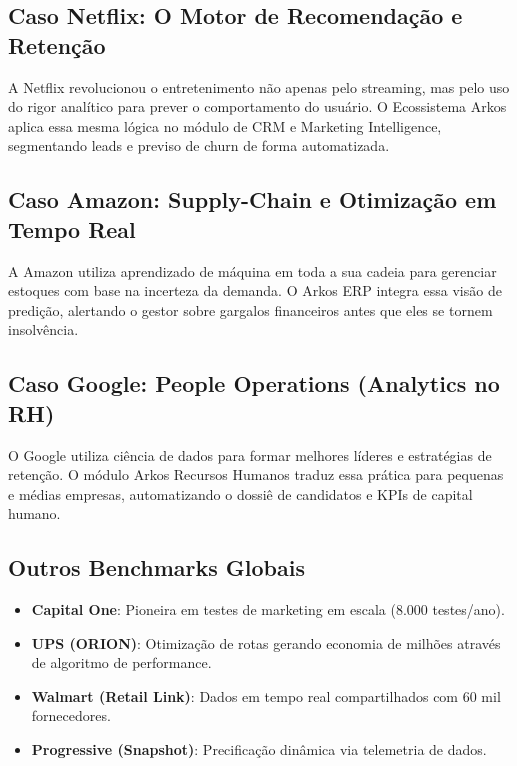 \documentclass[12pt,a4paper,oneside]{report}
\begin{document}
\subsection{Caso Netflix: O Motor de Recomendação e Retenção}
A Netflix revolucionou o entretenimento não apenas pelo streaming, mas pelo uso do rigor analítico para prever o comportamento do usuário. O Ecossistema Arkos aplica essa mesma lógica no módulo de CRM e Marketing Intelligence, segmentando leads e previso de churn de forma automatizada.

\subsection{Caso Amazon: Supply-Chain e Otimização em Tempo Real}
A Amazon utiliza aprendizado de máquina em toda a sua cadeia para gerenciar estoques com base na incerteza da demanda. O Arkos ERP integra essa visão de predição, alertando o gestor sobre gargalos financeiros antes que eles se tornem insolvência.

\subsection{Caso Google: People Operations (Analytics no RH)}
O Google utiliza ciência de dados para formar melhores líderes e estratégias de retenção. O módulo Arkos Recursos Humanos traduz essa prática para pequenas e médias empresas, automatizando o dossiê de candidatos e KPIs de capital humano.

\subsection{Outros Benchmarks Globais}
\begin{itemize}
    \item \textbf{Capital One}: Pioneira em testes de marketing em escala (8.000 testes/ano).
    \item \textbf{UPS (ORION)}: Otimização de rotas gerando economia de milhões através de algoritmo de performance.
    \item \textbf{Walmart (Retail Link)}: Dados em tempo real compartilhados com 60 mil fornecedores.
    \item \textbf{Progressive (Snapshot)}: Precificação dinâmica via telemetria de dados.
\end{itemize}

\pagebreak

\end{document}
